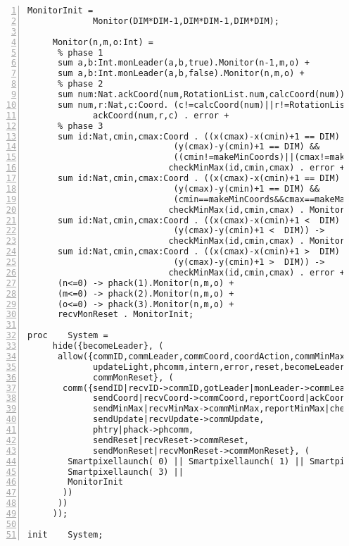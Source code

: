 \begin{Verbatim}[frame=lines,numbers=left,fontfamily=courier,fontsize=\footnotesize]
     MonitorInit = 
             Monitor(DIM*DIM-1,DIM*DIM-1,DIM*DIM);

     Monitor(n,m,o:Int) =
      % phase 1
      sum a,b:Int.monLeader(a,b,true).Monitor(n-1,m,o) +
      sum a,b:Int.monLeader(a,b,false).Monitor(n,m,o) +
      % phase 2
      sum num:Nat.ackCoord(num,RotationList.num,calcCoord(num)) . Monitor(n,m-1,o) +
      sum num,r:Nat,c:Coord. (c!=calcCoord(num)||r!=RotationList.num) ->
             ackCoord(num,r,c) . error +
      % phase 3
      sum id:Nat,cmin,cmax:Coord . ((x(cmax)-x(cmin)+1 == DIM) &&
                             (y(cmax)-y(cmin)+1 == DIM) &&
                             ((cmin!=makeMinCoords)||(cmax!=makeMaxCoords))) ->
                            checkMinMax(id,cmin,cmax) . error +
      sum id:Nat,cmin,cmax:Coord . ((x(cmax)-x(cmin)+1 == DIM) &&
                             (y(cmax)-y(cmin)+1 == DIM) &&
                             (cmin==makeMinCoords&&cmax==makeMaxCoords)) ->
                            checkMinMax(id,cmin,cmax) . Monitor(n,m,o-1) +
      sum id:Nat,cmin,cmax:Coord . ((x(cmax)-x(cmin)+1 <  DIM) ||
                             (y(cmax)-y(cmin)+1 <  DIM)) ->
                            checkMinMax(id,cmin,cmax) . Monitor(n,m,o) +
      sum id:Nat,cmin,cmax:Coord . ((x(cmax)-x(cmin)+1 >  DIM) ||
                             (y(cmax)-y(cmin)+1 >  DIM)) ->
                            checkMinMax(id,cmin,cmax) . error +
      (n<=0) -> phack(1).Monitor(n,m,o) +
      (m<=0) -> phack(2).Monitor(n,m,o) +
      (o<=0) -> phack(3).Monitor(n,m,o) +
      recvMonReset . MonitorInit;

proc    System =
     hide({becomeLeader}, (
      allow({commID,commLeader,commCoord,coordAction,commMinMax,commMinMax2,commUpdate,
             updateLight,phcomm,intern,error,reset,becomeLeader,timer,commReset,
             commMonReset}, (
       comm({sendID|recvID->commID,gotLeader|monLeader->commLeader,
             sendCoord|recvCoord->commCoord,reportCoord|ackCoord->coordAction,
             sendMinMax|recvMinMax->commMinMax,reportMinMax|checkMinMax->commMinMax2,
             sendUpdate|recvUpdate->commUpdate,
             phtry|phack->phcomm,
             sendReset|recvReset->commReset,
             sendMonReset|recvMonReset->commMonReset}, (
        Smartpixellaunch( 0) || Smartpixellaunch( 1) || Smartpixellaunch( 2) ||
        Smartpixellaunch( 3) ||
        MonitorInit
       ))
      ))
     ));

init    System;
\end{Verbatim}

